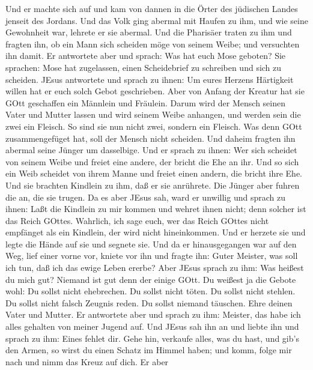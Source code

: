  Und er machte sich auf und kam von dannen in die Örter des
jüdischen Landes jenseit des Jordans. Und das Volk ging abermal mit
Haufen zu ihm, und wie seine Gewohnheit war, lehrete er sie abermal.
 Und die Pharisäer traten zu ihm und fragten ihn, ob ein
Mann sich scheiden möge von seinem Weibe; und versuchten ihn damit.
 Er antwortete aber und sprach: Was hat euch Mose geboten?
 Sie sprachen: Mose hat zugelassen, einen Scheidebrief zu
schreiben und sich zu scheiden.  JEsus antwortete und sprach
zu ihnen: Um eures Herzens Härtigkeit willen hat er euch solch Gebot
geschrieben.  Aber von Anfang der Kreatur hat sie GOtt
geschaffen ein Männlein und Fräulein.  Darum wird der Mensch
seinen Vater und Mutter lassen und wird seinem Weibe anhangen,
 und werden sein die zwei ein Fleisch. So sind sie nun nicht
zwei, sondern ein Fleisch.  Was denn GOtt zusammengefüget
hat, soll der Mensch nicht scheiden.  Und daheim fragten
ihn abermal seine Jünger um dasselbige.  Und er sprach zu
ihnen: Wer sich scheidet von seinem Weibe und freiet eine andere, der
bricht die Ehe an ihr.  Und so sich ein Weib scheidet von
ihrem Manne und freiet einen andern, die bricht ihre Ehe. 
Und sie brachten Kindlein zu ihm, daß er sie anrührete. Die Jünger aber
fuhren die an, die sie trugen.  Da es aber JEsus sah, ward
er unwillig und sprach zu ihnen: Laßt die Kindlein zu mir kommen und
wehret ihnen nicht; denn solcher ist das Reich GOttes. 
Wahrlich, ich sage euch, wer das Reich GOttes nicht empfänget als ein
Kindlein, der wird nicht hineinkommen.  Und er herzete sie
und legte die Hände auf sie und segnete sie.  Und da er
hinausgegangen war auf den Weg, lief einer vorne vor, kniete vor ihn und
fragte ihn: Guter Meister, was soll ich tun, daß ich das ewige Leben
ererbe?  Aber JEsus sprach zu ihm: Was heißest du mich gut?
Niemand ist gut denn der einige GOtt.  Du weißest ja die
Gebote wohl: Du sollst nicht ehebrechen. Du sollst nicht töten. Du
sollst nicht stehlen. Du sollst nicht falsch Zeugnis reden. Du sollst
niemand täuschen. Ehre deinen Vater und Mutter.  Er
antwortete aber und sprach zu ihm: Meister, das habe ich alles gehalten
von meiner Jugend auf.  Und JEsus sah ihn an und liebte ihn
und sprach zu ihm: Eines fehlet dir. Gehe hin, verkaufe alles, was du
hast, und gib's den Armen, so wirst du einen Schatz im Himmel haben; und
komm, folge mir nach und nimm das Kreuz auf dich.  Er aber

